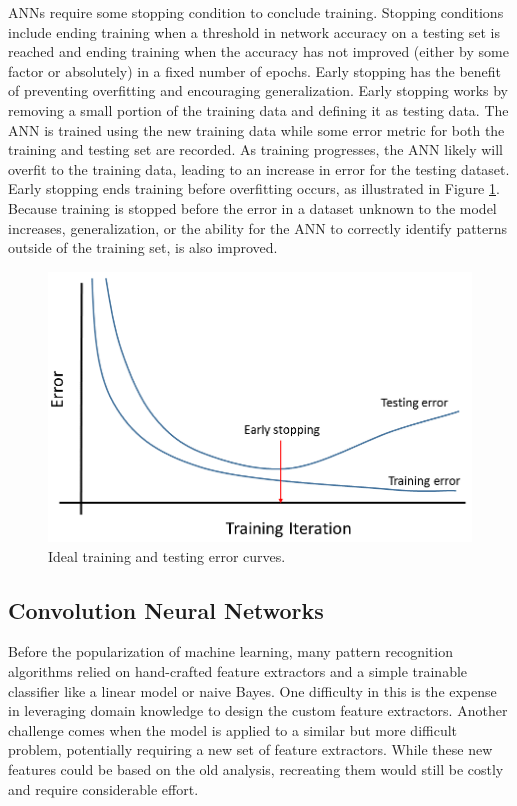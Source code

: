 ANNs require some stopping condition to conclude training. Stopping conditions include ending training when a threshold in network accuracy on a testing set is reached and ending training when the accuracy has not improved (either by some factor or absolutely) in a fixed number of epochs. Early stopping has the benefit of preventing overfitting and encouraging generalization. Early stopping works by removing a small portion of the training data and defining it as testing data. The ANN is trained using the new training data while some error metric for both the training and testing set are recorded. As training progresses, the ANN likely will overfit to the training data, leading to an increase in error for the testing dataset. Early stopping ends training before overfitting occurs, as illustrated in Figure \ref{fig:training_testing_error}. Because training is stopped before the error in a dataset unknown to the model increases, generalization, or the ability for the ANN to correctly identify patterns outside of the training set, is also improved.

\begin{figure}[H]
	\centering
	\includegraphics[width=0.85\linewidth]{images/training_testing_error_v2}
	\caption{Ideal training and testing error curves.}
	\label{fig:training_testing_error}
\end{figure}

\subsection{Convolution Neural Networks}

Before the popularization of machine learning, many pattern recognition algorithms relied on hand-crafted feature extractors and a simple trainable classifier like a linear model or naive Bayes. One difficulty in this is the expense in leveraging domain knowledge to design the custom feature extractors. Another challenge comes when the model is applied to a similar but more difficult problem, potentially requiring a new set of feature extractors. While these new features could be based on the old analysis, recreating them would still be costly and require considerable effort.

